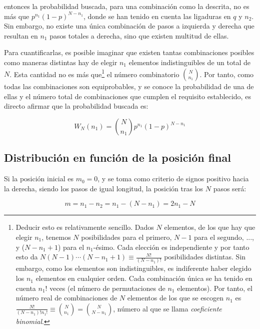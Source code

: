 \noindent entonces la probabilidad buscada, para una combinación como la descrita, no es más que $p^{n_1} (1-p)^{N-n_1}$, donde se han tenido en cuenta las ligaduras en $q$ y $n_2$. Sin embargo, no existe una única combinación de pasos a izquierda y derecha que resultan en $n_1$ pasos totales a derecha, sino que existen multitud de ellas.

Para cuantificarlas, es posible imaginar que existen tantas combinaciones posibles como maneras distintas hay de elegir $n_1$ elementos indistinguibles de un total de $N$. Esta cantidad no es más que\footnote{Deducir esto es relativamente sencillo. Dados $N$ elementos, de los que hay que elegir $n_1$, tenemos $N$ posibilidades para el primero, $N-1$ para el segundo, ..., y ($N-n_1+1$) para el $n_1$-ésimo. Cada elección es independiente y por tanto esto da $N(N-1)\cdots (N-n_1+1) \equiv \frac{N!}{(N-n_1)!}$ posibilidades distintas. Sin embargo, como los elementos son indistinguibles, es indiferente haber elegido los $n_1$ elementos en cualquier orden. Cada combinación única se ha tenido en cuenta $n_1!$ veces (el número de permutaciones de $n_1$ elementos). Por tanto, el número real de combinaciones de $N$ elementos de los que se escogen $n_1$ es $\frac{N!}{(N-n_1)! n_1!} \equiv \binom{N}{n_1} = \binom{N}{N-n_1}$, número al que se llama \textit{coeficiente binomial}.} el número combinatorio $\binom{N}{n_1}$. Por tanto, como todas las combinaciones son equiprobables, y se conoce la probabilidad de una de ellas y el número total de combinaciones que cumplen el requisito establecido, es directo afirmar que la probabilidad buscada es:

\begin{equation}
	W_N(n_1) = \binom{N}{n_1} p^{n_1} (1-p)^{N-n_1}
	\label{eq:distr_binomial}
\end{equation}

\subsection{Distribución en función de la posición final}
\label{sec:a_posicion}

Si la posición inicial es $m_0 = 0$, y se toma como criterio de signos positivo hacia la derecha, siendo los pasos de igual longitud, la posición tras los $N$ pasos será:

\begin{equation}
	m = n_1 - n_2 = n_1 - (N - n_1) = 2n_1 - N
	\label{eq:posicionfinal}
\end{equation}

